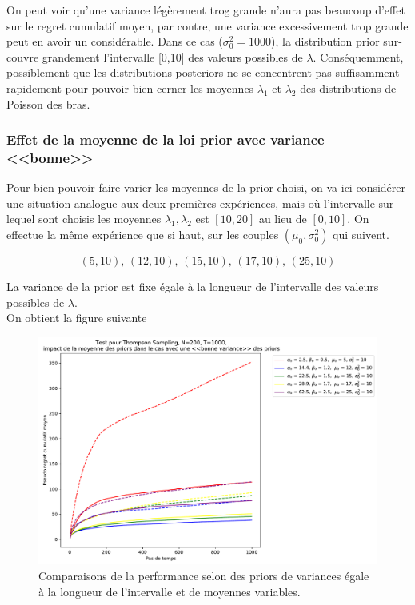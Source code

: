 \documentclass[letterpaper,11pt]{article}
\begin{document}
On peut voir qu'une variance légèrement trog grande n'aura pas beaucoup d'effet sur le regret cumulatif moyen, par contre, une variance excessivement trop grande peut en avoir un considérable. Dans ce cas ($\sigma^2_0=1000$), la distribution prior sur-couvre grandement l'intervalle [0,10] des valeurs possibles de $\lambda.$ Conséquemment, possiblement que les distributions posteriors ne se concentrent pas suffisamment rapidement pour pouvoir bien cerner les moyennes $\lambda_1$ et $\lambda_2$ des distributions de Poisson des bras.

\subsubsection{Effet de la moyenne de la loi prior avec variance <<bonne>>}

Pour bien pouvoir faire varier les moyennes de la prior choisi, on va ici considérer une situation analogue aux deux premières expériences, mais où l'intervalle sur lequel sont choisis les moyennes $\lambda_1, \lambda_2$ est $[10,20]$ au lieu de $[0,10].$ On effectue la même expérience que si haut, sur les couples  $(\mu_0 ,\sigma^2_0)$ qui suivent.


$$(5,10),\,(12,10),\,(15,10),\,(17,10),\,(25,10)$$

La variance de la prior est fixe égale à la longueur de l'intervalle des valeurs possibles de $\lambda.$\\ 

On obtient la figure suivante

\begin{figure}[H]
\label{figure: moyenne décalée 1}
\caption{Comparaisons de la performance selon des priors de variances égale à la longueur de l'intervalle et de moyennes variables.}
\begin{center}
\includegraphics[scale=0.5]{moyenne_decentree_variance_bonne_N=200.pdf}
\end{center}
\end{figure}
\end{document}
